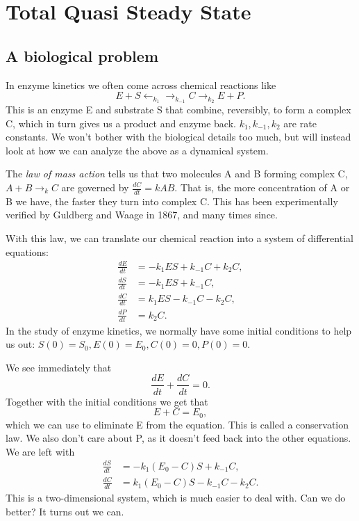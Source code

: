 \documentclass[12pt]{article}
\begin{document}
\section{Total Quasi Steady State}
\subsection{A biological problem}

In enzyme kinetics we often come across chemical reactions like
\begin{equation}
E + S \leftarrow_{k_1} \rightarrow_{k_{-1}} C \rightarrow_{k_2} E + P.
\end{equation}
This is an enzyme E and substrate S that combine, reversibly, to form
a complex C, which in turn gives us a product and enzyme back.
$k_1, k_{-1}, k_2$ are rate constants. We won't bother with the
biological details too much, but will instead look at how we can
analyze the above as a dynamical system.

The \textit{law of mass action} tells us that two molecules A and B forming
complex C, $A+B \rightarrow_k C$ are governed by $\frac{dC}{dt} = kAB$. That is,
the more concentration of A or B we have, the faster they turn into complex C.
This has been experimentally verified by Guldberg and Waage in 1867, and many
times since.

With this law, we can translate our chemical reaction into a system of
differential equations:
\begin{align}
\frac{dE}{dt} &= -k_1ES + k_{-1}C + k_2C, \\
\frac{dS}{dt} &= -k_1ES + k_{-1}C, \\
\frac{dC}{dt} &= k_1ES - k_{-1}C - k_2C, \\
\frac{dP}{dt} &= k_2C.
\end{align}
In the study of enzyme kinetics, we normally have some initial conditions to help
us out: $S(0) = S_0, E(0) = E_0, C(0)=0, P(0)=0$.

We see immediately that
\begin{equation}
\frac{dE}{dt} + \frac{dC}{dt} = 0.
\end{equation}
Together with the initial conditions we get that
\begin{equation}
E + C = E_0,
\end{equation}
which we can use to eliminate E from the equation. This is called a conservation
law.  We also don't care about P, as it doesn't feed back into the other
equations. We are left with
\begin{align}
\frac{dS}{dt} &= -k_1(E_0 - C)S + k_{-1}C, \\
\frac{dC}{dt} &= k_1(E_0 - C)S - k_{-1}C - k_2 C.
\end{align}
This is a two-dimensional system, which is much easier to deal with. Can we do
better? It turns out we can.
\end{document}
